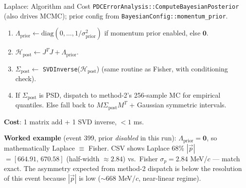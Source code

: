 \documentclass[aspectratio=169]{beamer}
\begin{document}
\begin{frame}{Laplace: Algorithm and Cost}
\small
\texttt{PDCErrorAnalysis::ComputeBayesianPosterior} (also drives MCMC); prior config from \texttt{BayesianConfig::momentum\_prior}.

\begin{enumerate}\setlength{\itemsep}{0pt}
\item $\Lambda_\mathrm{prior} \gets \mathrm{diag}(0,\dots,1/\sigma_\mathrm{prior}^2)$ if momentum prior enabled, else $\mathbf{0}$.
\item $\mathcal{H}_\mathrm{post} \gets J^T J + \Lambda_\mathrm{prior}$.
\item $\Sigma_\mathrm{post} \gets$ \texttt{SVDInverse}($\mathcal{H}_\mathrm{post}$) (same routine as Fisher, with conditioning check).
\item If $\Sigma_\mathrm{post}$ is PSD, dispatch to method-2's 256-sample MC for empirical quantiles. Else fall back to $M \Sigma_\mathrm{post} M^T$ + Gaussian symmetric intervals.
\end{enumerate}

\textbf{Cost}: 1 matrix add + 1 SVD inverse, $< 1$ ms.

\vspace{0.1cm}
\textbf{Worked example} (event 399, prior \emph{disabled} in this run): $\Lambda_\mathrm{prior} = \mathbf{0}$, so mathematically Laplace $\equiv$ Fisher. CSV shows Laplace 68\% $|\vec p|$ $= [664.91,\,670.58]$ (half-width $\approx 2.84$) vs.\ Fisher $\sigma_p = 2.84$ MeV/$c$ --- match exact. The asymmetry expected from method-2 dispatch is below the resolution of this event because $|\vec p|$ is low ($\sim 668$ MeV/$c$, near-linear regime).
\end{frame}
\end{document}
